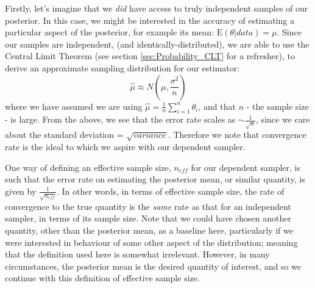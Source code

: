 \documentclass[11pt,fullpage]{book}
\begin{document}
Firstly, let's imagine that we \textit{did} have access to truly independent samples of our posterior. In this case, we might be interested in the accuracy of estimating a particular aspect of the posterior, for example its mean: $\mathrm{E}(\theta|data) = \mu$. Since our samples are independent, (and identically-distributed), we are able to use the Central Limit Theorem (see section \ref{sec:Probability_CLT} for a refresher), to derive an approximate sampling distribution for our estimator:
%
\begin{equation}
\hat{\mu} \approx N(\mu,\frac{\sigma^2}{n})
\end{equation}
%
where we have assumed we are using $\hat{\mu}=\frac{1}{n}\sum\limits_{i=1}^{n} \theta_i$, and that $n$ - the sample size - is large. From the above, we see that the error rate scales as $\sim\frac{1}{\sqrt{n}}$, since we care about the standard deviation = $\sqrt{variance}$. Therefore we note that convergence rate is the ideal to which we aspire with our dependent sampler. 

One way of defining an effective sample size, $n_{eff}$ for our dependent sampler, is such that the error rate on estimating the posterior mean, or similar quantity, is given by $\frac{1}{\sqrt{n_{eff}}}$. In other words, in terms of effective sample size, the rate of convergence to the true quantity is the \textit{same} rate as that for an independent sampler, in terms of its sample size. Note that we could have chosen another quantity, other than the posterior mean, as a baseline here, particularly if we were interested in behaviour of some other aspect of the distribution; meaning that the definition used here is somewhat irrelevant. However, in many circumstances, the posterior mean is the desired quantity of interest, and so we continue with this definition of effective sample size. 
\end{document}
